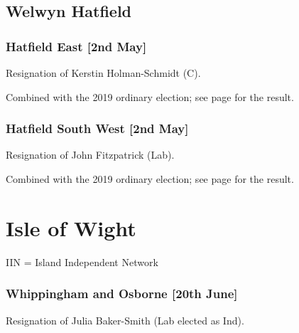 \documentclass[a4paper,openany]{book}
\begin{document}
\begin{resultsiii}
\subsection*{Welwyn Hatfield}

\subsubsection*{Hatfield East \hspace*{\fill}\nolinebreak[1]%
	\enspace\hspace*{\fill}
	[2nd May]}


Resignation of Kerstin Holman-Schmidt (C).

Combined with the 2019 ordinary election; see page \pageref{HatfieldEastWelwynHatfield} for the result.

\subsubsection*{Hatfield South West \hspace*{\fill}\nolinebreak[1]%
	\enspace\hspace*{\fill}
	[2nd May]}


Resignation of John Fitzpatrick (Lab).

Combined with the 2019 ordinary election; see page \pageref{HatfieldSouthWestWelwynHatfield} for the result.

\section{Isle of Wight}

IIN = Island Independent Network

\subsubsection*{Whippingham and Osborne \hspace*{\fill}\nolinebreak[1]%
	\enspace\hspace*{\fill}
	[20th June]}


Resignation of Julia Baker-Smith (Lab elected as Ind).


\end{resultsiii}
\end{document}
